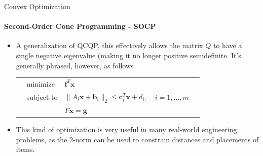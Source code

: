 \documentclass{beamer}
\renewcommand{\vec}{\mathbf}
\begin{document}
	\begin{frame}{Convex Optimization}
		\framesubtitle{Second-Order Cone Programming - SOCP}
		\begin{itemize}
			\item A generalization of QCQP, this effectively allows the matrix $Q$ to have a single negative eigenvalue (making it no longer positive semidefinite. It's generally phrased, however, as follows
			\begin{tabularx}{\textwidth}{X l l l X}
				& minimize		& $\vec{f}^T\vec{x}$	& &\\
				& subject to	& $\lVert A_i\vec{x} + \vec{b}_i\rVert_2\leq\vec{c}_i^T\vec{x} + d_i,$	& $i=1,...,m$ &\\
				&				& $F\vec{x} = \vec{g}$ & &
			\end{tabularx}
			\item This kind of optimization is very useful in many real-world engineering problems, as the 2-norm can be used to constrain distances and placements of items. 
		\end{itemize}
	\end{frame}
%	
\end{document}
